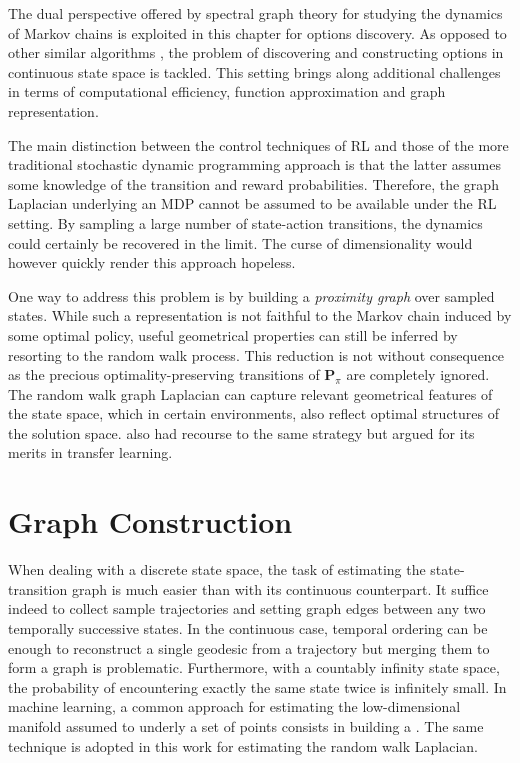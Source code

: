 The dual perspective offered by spectral graph theory for studying the dynamics of Markov chains is exploited in this chapter for options discovery. As opposed to other similar algorithms \parencite{Menache2002, Mannor2004, Mathew2012, Bouvrie2012}, the problem of discovering and constructing options in continuous state space is tackled. This setting brings along additional challenges in terms of computational efficiency, function approximation and graph representation.

The main distinction between the control techniques of RL and those of the more traditional stochastic dynamic programming approach is that the latter assumes some knowledge of the transition and reward probabilities. Therefore, the graph Laplacian underlying an MDP  cannot be assumed to be available  under the RL setting. By sampling a large number of state-action transitions, the dynamics could certainly be recovered in the limit. The curse of dimensionality would however quickly render this approach hopeless.

One way to address this problem is by building a \textit{proximity graph}
over sampled states. While such a representation is not faithful to the Markov chain induced by some optimal policy, useful geometrical properties can still be inferred by resorting to the random walk process.  This reduction is not without consequence as the precious optimality-preserving transitions of $\mathbf{P}_\pi$ are completely ignored. The random walk graph Laplacian can capture relevant geometrical features of the state space, which in certain environments,  also reflect optimal structures of the solution space. \cite{Mahadevan2007} also had recourse to the same strategy but argued for its merits in transfer learning.

\section{Graph Construction}
\label{sec:proximitygraphs}

When dealing with a discrete state space, the task of estimating the state-transition graph is much easier than with its  continuous counterpart. It suffice indeed to collect sample trajectories and setting graph edges between any two temporally successive states. In the continuous case, temporal ordering can be enough to reconstruct a single geodesic from a trajectory but merging them to form a graph is problematic. Furthermore, with a countably infinity state space, the probability of encountering exactly the same state twice is infinitely small.  In machine learning, a common approach for estimating the low-dimensional manifold assumed to underly a set of points consists in building a . The same technique is adopted in this work for estimating the random walk Laplacian.

